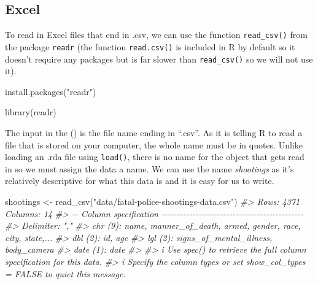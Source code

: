 \documentclass[
]{krantz}
\makeatletter
\newenvironment{Shaded}{\begin{snugshade}}{\end{snugshade}}
\newcommand{\CommentTok}[1]{\textcolor[rgb]{0.37,0.37,0.37}{\textit{#1}}}
\newcommand{\FunctionTok}[1]{\textcolor[rgb]{0,0,0}{#1}}
\newcommand{\NormalTok}[1]{#1}
\newcommand{\OtherTok}[1]{\textcolor[rgb]{0.37,0.37,0.37}{#1}}
\newcommand{\StringTok}[1]{\textcolor[rgb]{0.5,0.5,0.5}{#1}}
\newenvironment{kframe}{%
\medskip{}
\setlength{\fboxsep}{.8em}
 \def\at@end@of@kframe{}%
 \ifinner\ifhmode%
  \def\at@end@of@kframe{\end{minipage}}%
  \begin{minipage}{\columnwidth}%
 \fi\fi%
 \def\FrameCommand##1{\hskip\@totalleftmargin \hskip-\fboxsep
 \colorbox{shadecolor}{##1}\hskip-\fboxsep
     \hskip-\linewidth \hskip-\@totalleftmargin \hskip\columnwidth}%
 \MakeFramed {\advance\hsize-\width
   \@totalleftmargin\z@ \linewidth\hsize
   \@setminipage}}%
 {\par\unskip\endMakeFramed%
 \at@end@of@kframe}
\renewenvironment{Shaded}{\begin{kframe}}{\end{kframe}}
\makeatother
\begin{document}
\hypertarget{excel}{%
\subsection{Excel}\label{excel}}

To read in Excel files that end in .csv, we can use the function \texttt{read\_csv()} from the package \texttt{readr} (the function \texttt{read.csv()} is included in R by default so it doesn't require any packages but is far slower than \texttt{read\_csv()} so we will not use it).

\begin{Shaded}
\begin{Highlighting}[]
\FunctionTok{install.packages}\NormalTok{(}\StringTok{"readr"}\NormalTok{)}
\end{Highlighting}
\end{Shaded}

\begin{Shaded}
\begin{Highlighting}[]
\FunctionTok{library}\NormalTok{(readr)}
\end{Highlighting}
\end{Shaded}

The input in the () is the file name ending in ``.csv''. As it is telling R to read a file that is stored on your computer, the whole name must be in quotes. Unlike loading an .rda file using \texttt{load()}, there is no name for the object that gets read in so we must assign the data a name. We can use the name \emph{shootings} as it's relatively descriptive for what this data is and it is easy for us to write.

\begin{Shaded}
\begin{Highlighting}[]
\NormalTok{shootings }\OtherTok{\textless{}{-}} \FunctionTok{read\_csv}\NormalTok{(}\StringTok{"data/fatal{-}police{-}shootings{-}data.csv"}\NormalTok{)}
\CommentTok{\#\textgreater{} Rows: 4371 Columns: 14}
\CommentTok{\#\textgreater{} {-}{-} Column specification {-}{-}{-}{-}{-}{-}{-}{-}{-}{-}{-}{-}{-}{-}{-}{-}{-}{-}{-}{-}{-}{-}{-}{-}{-}{-}{-}{-}{-}{-}{-}{-}{-}{-}{-}{-}{-}{-}{-}{-}{-}{-}{-}{-}{-}{-}}
\CommentTok{\#\textgreater{} Delimiter: ","}
\CommentTok{\#\textgreater{} chr  (9): name, manner\_of\_death, armed, gender, race, city, state,...}
\CommentTok{\#\textgreater{} dbl  (2): id, age}
\CommentTok{\#\textgreater{} lgl  (2): signs\_of\_mental\_illness, body\_camera}
\CommentTok{\#\textgreater{} date (1): date}
\CommentTok{\#\textgreater{} }
\CommentTok{\#\textgreater{} i Use \textasciigrave{}spec()\textasciigrave{} to retrieve the full column specification for this data.}
\CommentTok{\#\textgreater{} i Specify the column types or set \textasciigrave{}show\_col\_types = FALSE\textasciigrave{} to quiet this message.}
\end{Highlighting}
\end{Shaded}
\end{document}
